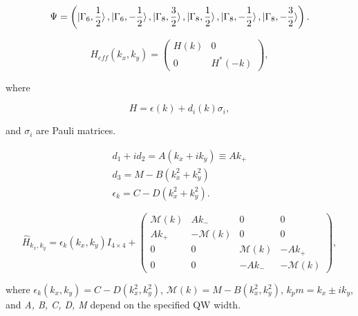 \documentclass[titlepage,a4paper]{book}
\begin{document}
\begin{equation}
\label{1}
\Psi = \left( \ket{\Gamma_6, \frac{1}{2}}, \ket{\Gamma_6, -\frac{1}{2}}, \ket{\Gamma_8, \frac{3}{2}}, \ket{\Gamma_8, \frac{1}{2}}, \ket{\Gamma_8, -\frac{1}{2}}, \ket{\Gamma_8, -\frac{3}{2}}  \right).
\end{equation}


\begin{equation}
\label{2}
H_{eff}(k_x, k_y) =  \left( \begin{array}{cc}
H(k) & 0 \\
0 & H^*(-k) \end{array} \right),
\end{equation}

where 

\begin{equation}
\label{3}
H = \epsilon (k) + d_i (k) \sigma_i,
\end{equation}

and $\sigma_i$ are Pauli matrices.

\begin{equation}
\begin{aligned}
\label{4}
d_1 + id_2 = A(k_x + ik_y) \equiv Ak_+ \\
d_3 = M - B(k_x^2 + k_y^2) \\
\epsilon_k = C - D(k_x^2 + k_y^2).
\end{aligned}
\end{equation}

\begin{equation}
\label{asd}
\hat{H}_{k_x, k_y} = \epsilon_k(k_x, k_y) I_{4 \times 4} + \left( \begin{array}{cccc}
\mathcal{M}(k) & Ak_- & 0 & 0 \\
Ak_+ & -\mathcal{M}(k) & 0 & 0 \\
0 & 0 & \mathcal{M}(k) & -Ak_+ \\
0 & 0 & -Ak_- & -\mathcal{M}(k) \end{array} \right),
\end{equation}

where $\epsilon_k(k_x, k_y) = C - D(k_x^2, k_y^2)$, $\mathcal{M}(k) = M - B(k_x^2, k_y^2)$, $k_pm = k_x \pm ik_y$, and \textit{A, B, C, D, M} depend on the specified QW width.
\fi
\end{document}
